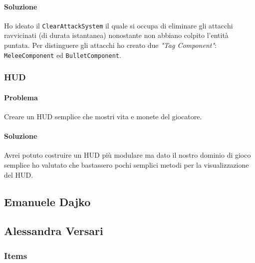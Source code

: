 \documentclass[a4paper,12pt]{report}
\begin{document}
\paragraph{Soluzione}
Ho ideato il \texttt{ClearAttackSystem} il quale si occupa di eliminare gli attacchi
ravvicinati (di durata istantanea) nonostante non abbiano colpito l'entità puntata.
Per distinguere gli attacchi ho creato due \textit{"Tag Component"}: \texttt{MeleeComponent}
ed \texttt{BulletComponent}.

\subsubsection{HUD}

\paragraph{Problema}
Creare un HUD semplice che mostri vita e monete del giocatore.
\paragraph{Soluzione}
Avrei potuto costruire un HUD più modulare ma dato il nostro dominio di 
gioco semplice ho valutato che bastassero pochi semplici metodi per la 
visualizzazione del HUD. 

\subsection{Emanuele Dajko}








\subsection{Alessandra Versari}
\subsubsection*{Items}
\end{document}
